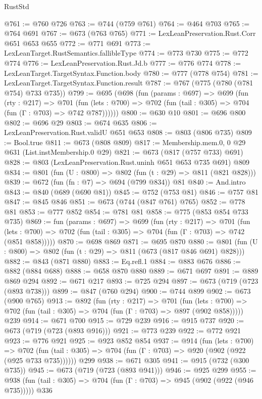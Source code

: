 \begin{lexlean}{RustStd}
\begin{coremodule}
{\begin{coremodule}
{{{{{{{{{{@761 := @760 @726
@763 := @744 (@759 @761)
@764 := @464 @703
@765 := @764 @691
@767 := @673 (@763 @765)
@771 := LexLeanPreservation.Rust.Corr @651 @653 @655
@772 := @771 @691
@773 := LexLeanTarget.RustSemantics.fallibleType
@774 := @773 @730
@775 := @772 @774
@776 := LexLeanPreservation.Rust.Jd.b
@777 := @776 @774
@778 := LexLeanTarget.TargetSyntax.Function.body
@780 := @777 (@778 @754)
@781 := LexLeanTarget.TargetSyntax.Function.result
@787 := @767 (@775 (@780 (@781 @754) @733 @735))
@799 := @695
    (@698
      (fun (params : @697) =>
      @699
        (fun (rty : @217) =>
        @701
          (fun (lets : @700) => @702 (fun (tail : @305) => @704 (fun (Γ : @703) => @742 @787))))))
@800 := @630 @10
@801 := @696 @800
@802 := @696 @29
@803 := @674 @635
@806 := LexLeanPreservation.Rust.validU @651 @653
@808 := @803 (@806 @735)
@809 := Bool.true
@811 := @673 (@808 @809)
@817 := Membership.mem.{0, 0} @29 @631 (List.instMembership.{0} @29)
@821 := @673 (@817 (@757 @733) @691)
@828 := @803 (LexLeanPreservation.Rust.uninh @651 @653 @735 @691) @809
@834 := @801 (fun (U : @800) => @802 (fun (t : @29) => @811 (@821 @828)))
@839 := @672 (fun (fn : @7) => @694 (@799 @834)) @81
@840 := And.intro
@843 := @840 (@689 (@690 @81))
@845 := @752 (@753 @81)
@846 := @757 @81
@847 := @845 @846
@851 := @673 (@744 (@847 @761) @765)
@852 := @778 @81
@853 := @777 @852
@854 := @781 @81
@858 := @775 (@853 @854 @733 @735)
@869 := fun (params : @697) =>
  @699
    (fun (rty : @217) =>
    @701
      (fun (lets : @700) => @702 (fun (tail : @305) => @704 (fun (Γ : @703) => @742 (@851 @858)))))
@870 := @698 @869
@871 := @695 @870
@880 := @801 (fun (U : @800) => @802 (fun (t : @29) => @811 (@673 (@817 @846 @691) @828)))
@882 := @843 (@871 @880)
@883 := Eq.refl.{1}
@884 := @883 @676
@886 := @882 (@884 @688)
@888 := @658 @870 @880
@889 := @671 @697
@891 := @889 @869 @294
@892 := @671 @217
@893 := @725 @294
@897 := @673 (@719 (@723 (@893 @738)))
@899 := @847 (@760 @294)
@900 := @744 @899
@902 := @673 (@900 @765)
@913 := @892
    (fun (rty : @217) =>
    @701
      (fun (lets : @700) => @702 (fun (tail : @305) => @704 (fun (Γ : @703) => @897 (@902 @858)))))
    @239
@914 := @671 @700
@915 := @729 @239
@916 := @915 @737
@920 := @673 (@719 (@723 (@893 @916)))
@921 := @773 @239
@922 := @772 @921
@923 := @776 @921
@925 := @923 @852 @854
@937 := @914
    (fun (lets : @700) =>
    @702 (fun (tail : @305) => @704 (fun (Γ : @703) => @920 (@902 (@922 (@925 @733 @735))))))
    @299
@938 := @671 @305
@941 := @915 (@732 (@300 @735))
@945 := @673 (@719 (@723 (@893 @941)))
@946 := @925 @299
@955 := @938 (fun (tail : @305) => @704 (fun (Γ : @703) => @945 (@902 (@922 (@946 @735))))) @336
}}}}}}}}}}
\end{coremodule}}
\end{coremodule}
\end{lexlean}
